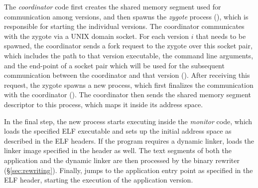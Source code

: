 

The \emph{coordinator} code first creates the shared memory segment
used for communication among versions, and then spawns the
\textit{zygote} process (), which is responsible for starting
the individual versions. The coordinator communicates with the zygote
via a UNIX domain socket. For each version $i$ that needs to be spawned,
the coordinator sends a fork request to the zygote over this socket
pair, which includes the path to that version executable, the command
line arguments, and the end-point of a socket pair which will be used
for the subsequent communication between the coordinator and that
version ().
%
After receiving this request, the zygote spawns a new process, which
first finalizes the communication with the coordinator
().  The coordinator then sends the shared memory
segment descriptor to this process, which maps it inside its address
space.


In the final step, the new process starts executing inside the
\emph{monitor} code, which loads the specified ELF executable and sets
up the initial address space as described in the ELF headers. If the
program requires a dynamic linker, \vx loads the linker image specified
in the header as well.
The text segments of both the application and the dynamic linker are
then processed by the binary rewriter (\S\ref{sec:rewriting}). Finally,
\vx jumps to the application entry point as specified in the ELF header,
starting the execution of the application version.


